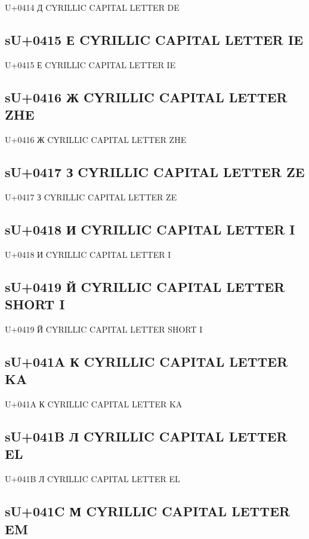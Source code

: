 U+0414 Д  CYRILLIC CAPITAL LETTER DE

\subsection{sU+0415 Е  CYRILLIC CAPITAL LETTER IE}

U+0415 Е  CYRILLIC CAPITAL LETTER IE

\subsection{sU+0416 Ж  CYRILLIC CAPITAL LETTER ZHE}

U+0416 Ж  CYRILLIC CAPITAL LETTER ZHE

\subsection{sU+0417 З  CYRILLIC CAPITAL LETTER ZE}

U+0417 З  CYRILLIC CAPITAL LETTER ZE

\subsection{sU+0418 И  CYRILLIC CAPITAL LETTER I}

U+0418 И  CYRILLIC CAPITAL LETTER I

\subsection{sU+0419 Й  CYRILLIC CAPITAL LETTER SHORT I}

U+0419 Й  CYRILLIC CAPITAL LETTER SHORT I

\subsection{sU+041A К  CYRILLIC CAPITAL LETTER KA}

U+041A К  CYRILLIC CAPITAL LETTER KA

\subsection{sU+041B Л  CYRILLIC CAPITAL LETTER EL}

U+041B Л  CYRILLIC CAPITAL LETTER EL

\subsection{sU+041C М  CYRILLIC CAPITAL LETTER EM}

